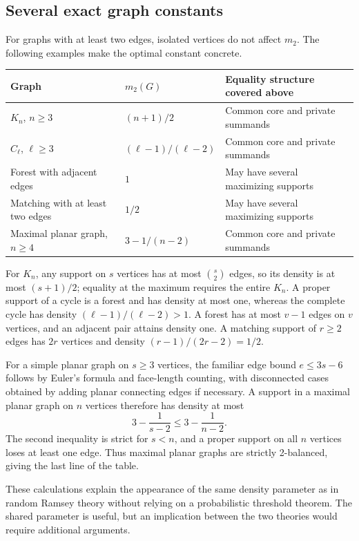 \documentclass[11pt]{article}
\theoremstyle{definition}
\theoremstyle{remark}
\newcommand{\1}{\mathbf 1}
\begin{document}
\subsection{Several exact graph constants}

For graphs with at least two edges, isolated vertices do not affect $m_2$.
The following examples make the optimal constant concrete.
\begin{center}
\begin{tabular}{@{}lll@{}}
\toprule
Graph & $m_2(G)$ & Equality structure covered above\\
\midrule
$K_n$, $n\ge3$ & $(n+1)/2$ & Common core and private summands\\
$C_\ell$, $\ell\ge3$ & $(\ell-1)/(\ell-2)$ & Common core and private summands\\
Forest with adjacent edges & $1$ & May have several maximizing supports\\
Matching with at least two edges & $1/2$ & May have several maximizing supports\\
Maximal planar graph, $n\ge4$ & $3-1/(n-2)$ & Common core and private summands\\
\bottomrule
\end{tabular}
\end{center}

For $K_n$, any support on $s$ vertices has at most $\binom{s}{2}$ edges, so
its density is at most $(s+1)/2$; equality at the maximum requires the entire
$K_n$. A proper support of a cycle is a forest and has density at most one,
whereas the complete cycle has density $(\ell-1)/(\ell-2)>1$.
A forest has at most $v-1$ edges on $v$ vertices, and an adjacent pair attains
density one. A matching support of $r\ge2$ edges has $2r$ vertices and density
$(r-1)/(2r-2)=1/2$.

For a simple planar graph on $s\ge3$ vertices, the familiar edge bound
$e\le3s-6$ follows by Euler's formula and face-length counting, with disconnected
cases obtained by adding planar connecting edges if necessary. A support in a
maximal planar graph on $n$ vertices therefore has density at most
\[
 3-\frac1{s-2}\le3-\frac1{n-2}.
\]
The second inequality is strict for $s<n$, and a proper support on all $n$
vertices loses at least one edge. Thus maximal planar graphs are strictly
2-balanced, giving the last line of the table.

These calculations explain the appearance of the same density parameter as in
random Ramsey theory without relying on a probabilistic threshold theorem.
The shared parameter is useful, but an implication between the two theories
would require additional arguments.
\end{document}
